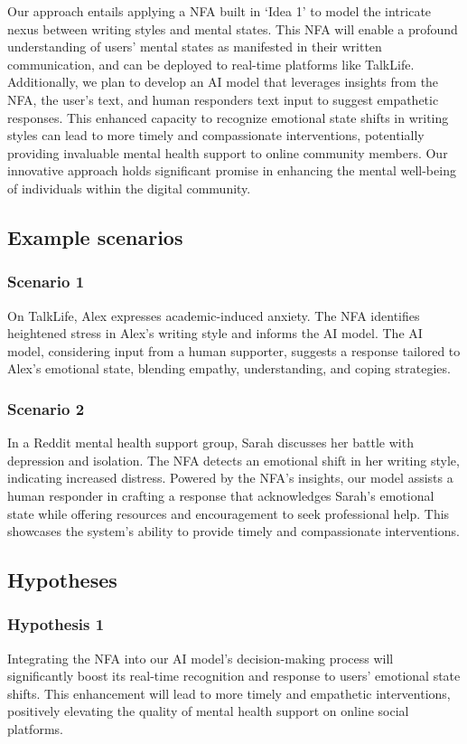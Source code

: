 \documentclass[conference,compsoc]{IEEEtran}
\begin{document}
Our approach entails applying a NFA built in `Idea 1' to model the intricate nexus between writing styles and mental states. This NFA will enable a profound understanding of users' mental states as manifested in their written communication, and can be deployed to real-time platforms like TalkLife. Additionally, we plan to develop an AI model that leverages insights from the NFA, the user's text, and human responders text input to suggest empathetic responses. This enhanced capacity to recognize emotional state shifts in writing styles can lead to more timely and compassionate interventions, potentially providing invaluable mental health support to online community members. Our innovative approach holds significant promise in enhancing the mental well-being of individuals within the digital community.

\subsection{Example scenarios}
\subsubsection{Scenario 1}
On TalkLife, Alex expresses academic-induced anxiety. The NFA identifies heightened stress in Alex's writing style and informs the AI model. The AI model, considering input from a human supporter, suggests a response tailored to Alex's emotional state, blending empathy, understanding, and coping strategies.

\subsubsection{Scenario 2}
In a Reddit mental health support group, Sarah discusses her battle with depression and isolation. The NFA detects an emotional shift in her writing style, indicating increased distress. Powered by the NFA's insights, our model assists a human responder in crafting a response that acknowledges Sarah's emotional state while offering resources and encouragement to seek professional help. This showcases the system's ability to provide timely and compassionate interventions.

\subsection{Hypotheses}
\subsubsection{Hypothesis 1}
Integrating the NFA into our AI model's decision-making process will significantly boost its real-time recognition and response to users' emotional state shifts. This enhancement will lead to more timely and empathetic interventions, positively elevating the quality of mental health support on online social platforms.
\end{document}
